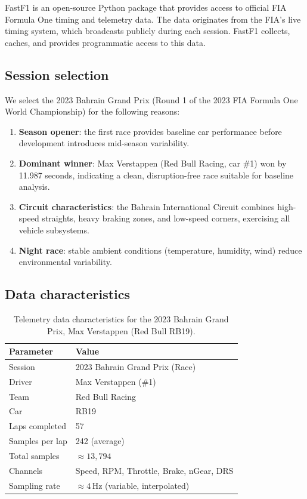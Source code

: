 \documentclass[twocolumn,10pt,a4paper]{article}
\theoremstyle{definition}
\theoremstyle{remark}
\begin{document}
FastF1 \citep{Theelke2023} is an open-source Python package that provides access to official FIA Formula One timing and telemetry data. The data originates from the FIA's live timing system, which broadcasts publicly during each session. FastF1 collects, caches, and provides programmatic access to this data.

\subsection{Session selection}

We select the 2023 Bahrain Grand Prix (Round 1 of the 2023 FIA Formula One World Championship) for the following reasons:
\begin{enumerate}
    \item \textbf{Season opener}: the first race provides baseline car performance before development introduces mid-season variability.
    \item \textbf{Dominant winner}: Max Verstappen (Red Bull Racing, car \#1) won by 11.987 seconds, indicating a clean, disruption-free race suitable for baseline analysis.
    \item \textbf{Circuit characteristics}: the Bahrain International Circuit combines high-speed straights, heavy braking zones, and low-speed corners, exercising all vehicle subsystems.
    \item \textbf{Night race}: stable ambient conditions (temperature, humidity, wind) reduce environmental variability.
\end{enumerate}

\subsection{Data characteristics}

\begin{table}[!htbp]
\centering
\caption{Telemetry data characteristics for the 2023 Bahrain Grand Prix, Max Verstappen (Red Bull RB19).}
\label{tab:data}
\begin{tabular}{@{}ll@{}}
\toprule
Parameter & Value \\
\midrule
Session & 2023 Bahrain Grand Prix (Race) \\
Driver & Max Verstappen (\#1) \\
Team & Red Bull Racing \\
Car & RB19 \\
Laps completed & 57 \\
Samples per lap & 242 (average) \\
Total samples & $\approx 13{,}794$ \\
Channels & Speed, RPM, Throttle, Brake, nGear, DRS \\
Sampling rate & $\approx 4$\,Hz (variable, interpolated) \\
\bottomrule
\end{tabular}
\end{table}
\end{document}
